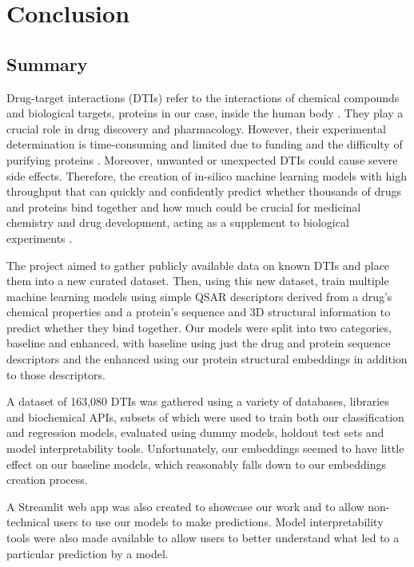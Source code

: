 \section{Conclusion}

\subsection{Summary}

Drug-target interactions (DTIs) refer to the interactions of chemical compounds and biological targets, proteins in our case, inside the human body \citep{Sachdev2019}. They play a crucial role in drug discovery and pharmacology. However, their experimental determination is time-consuming and limited due to funding and the difficulty of purifying proteins \citep{Shar2016, Wang2020}. Moreover, unwanted or unexpected DTIs could cause severe side effects. Therefore, the creation of in-silico machine learning models with high throughput that can quickly and confidently predict whether thousands of drugs and proteins bind together and how much could be crucial for medicinal chemistry and drug development, acting as a supplement to biological experiments \citep{Shar2016, Wang2020}.

The project aimed to gather publicly available data on known DTIs and place them into a new curated dataset. Then, using this new dataset, train multiple machine learning models using simple QSAR descriptors derived from a drug's chemical properties and a protein's sequence and 3D structural information to predict whether they bind together. Our models were split into two categories, baseline and enhanced, with baseline using just the drug and protein sequence descriptors and the enhanced using our protein structural embeddings in addition to those descriptors.

A dataset of 163,080 DTIs was gathered using a variety of databases, libraries and biochemical APIs, subsets of which were used to train both our classification and regression models, evaluated using dummy models, holdout test sets and model interpretability tools. Unfortunately, our embeddings seemed to have little effect on our baseline models, which reasonably falls down to our embeddings creation process.

A Streamlit web app was also created to showcase our work and to allow non-technical users to use our models to make predictions. Model interpretability tools were also made available to allow users to better understand what led to a particular prediction by a model.

